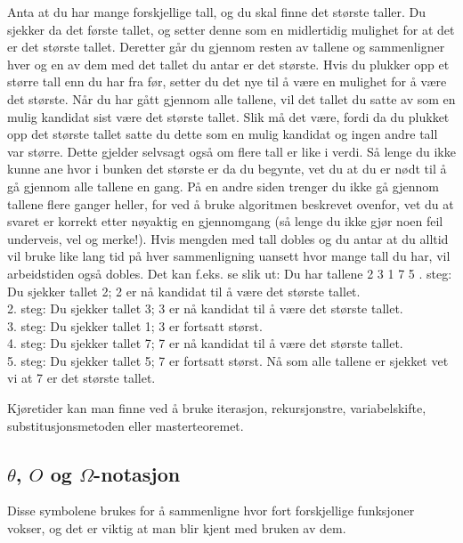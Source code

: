 \begin{boxed}
Anta at du har mange forskjellige tall, og du skal finne det største taller. Du sjekker da det første tallet, og setter denne som en midlertidig mulighet for at det er det største tallet. Deretter går du gjennom resten av tallene og sammenligner hver og en av dem med det tallet du antar er det største. Hvis du plukker opp et større tall enn du har fra før, setter du det nye til å være en mulighet for å være det største. Når du har gått gjennom alle tallene, vil det tallet du satte av som en mulig kandidat sist være det største tallet. Slik må det være, fordi da du plukket opp det største tallet satte du dette som en mulig kandidat og ingen andre tall var større. Dette gjelder selvsagt også om flere tall er like i verdi. Så lenge du ikke kunne ane hvor i bunken det største er da du begynte, vet du at du er nødt til å gå gjennom alle tallene en gang.
\newline \newline
På en andre siden trenger du ikke gå gjennom tallene flere ganger heller, for ved å bruke algoritmen beskrevet ovenfor, vet du at svaret er korrekt etter nøyaktig en gjennomgang (så lenge du ikke gjør noen feil underveis, vel og merke!). Hvis mengden med tall dobles og du antar at du alltid vil bruke like lang tid på hver sammenligning uansett hvor mange tall du har, vil arbeidstiden også dobles. Det kan f.eks. se slik ut:
\newline \newline
Du har tallene 2 3 1 7 5
\newline {}. steg: Du sjekker tallet 2; 2 er nå kandidat til å være det største tallet.\\
2. steg: Du sjekker tallet 3; 3 er nå kandidat til å være det største tallet.\\
3. steg: Du sjekker tallet 1; 3 er fortsatt størst.\\
4. steg: Du sjekker tallet 7; 7 er nå kandidat til å være det største tallet.\\
5. steg: Du sjekker tallet 5; 7 er fortsatt størst.
\newline \newline
Nå som alle tallene er sjekket vet vi at 7 er det største tallet.
\end{boxed}

\noindent Kjøretider kan man finne ved å bruke iterasjon, rekursjonstre, variabelskifte, substitusjonsmetoden eller masterteoremet.

\subsection{$\theta$, $O$ og $\Omega$-notasjon}
Disse symbolene brukes for å sammenligne hvor fort forskjellige funksjoner vokser, og det er viktig at man blir kjent med bruken av dem.

